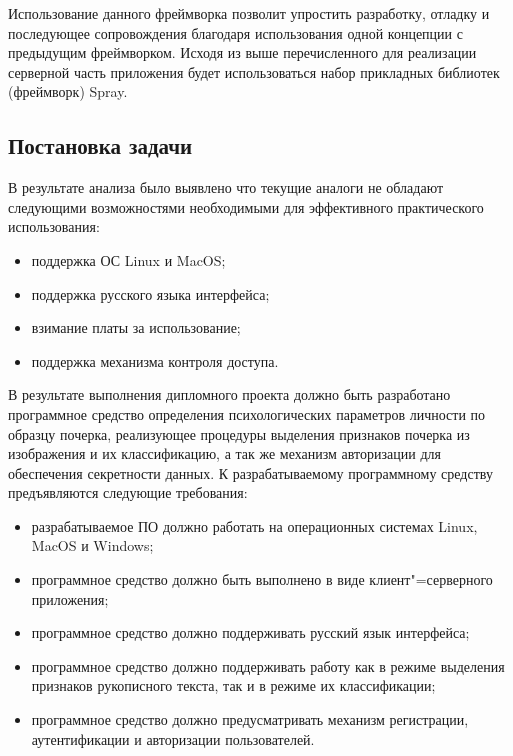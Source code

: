 Использование данного фреймворка позволит упростить разработку, отладку и последующее сопровождения благодаря использования одной концепции с предыдущим фреймворком.
Исходя из выше перечисленного для реализации серверной часть приложения будет использоваться набор прикладных библиотек (фреймворк) Spray.

\subsection{Постановка задачи}
\label{sec:domain:requirements}
В результате анализа было выявлено что текущие аналоги не обладают следующими возможностями необходимыми для эффективного практического использования:
\begin{itemize}
  \item поддержка ОС Linux и MacOS;
  \item поддержка русского языка интерфейса;
  \item взимание платы за использование;
  \item поддержка механизма контроля доступа.
\end{itemize}

В результате выполнения дипломного проекта должно быть разработано программное средство определения психологических параметров личности по образцу почерка, реализующее процедуры выделения признаков почерка из изображения и их классификацию, а так же механизм авторизации для обеспечения секретности данных. К разрабатываемому программному средству предъявляются следующие требования:
\begin{itemize}
\item разрабатываемое ПО должно работать на операционных системах Linux, MacOS и Windows;
\item программное средство должно быть выполнено в виде клиент"=серверного приложения;
\item программное средство должно поддерживать русский язык интерфейса;
\item программное средство должно поддерживать работу как в режиме выделения признаков рукописного текста, так и в режиме их классификации;
\item программное средство должно предусматривать механизм регистрации, аутентификации и авторизации пользователей.
\end{itemize}